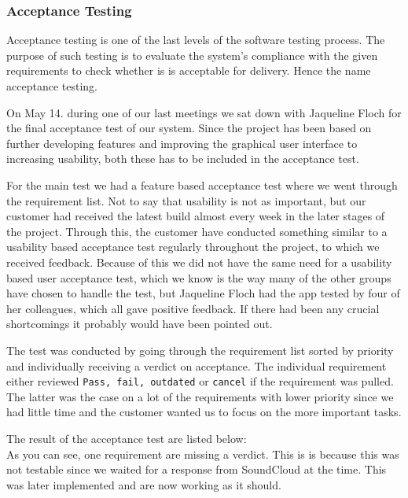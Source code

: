 \subsubsection{Acceptance Testing}
Acceptance testing is one of the last levels of the software testing process. The purpose of such testing is to evaluate the system's compliance with the given requirements to check whether is is acceptable for delivery. Hence the name acceptance testing.

On May 14. during one of our last meetings we sat down with Jaqueline Floch for the final acceptance test of our system. Since the project has been based on further developing features and improving the graphical user interface to increasing usability, both these has to be included in the acceptance test.

For the main test we had a feature based acceptance test where we went through the requirement list. Not to say that usability is not as important, but our customer had received the latest build almost every week in the later stages of the project. Through this, the customer have conducted something similar to a usability based acceptance test regularly throughout the project, to which we received feedback. Because of this we did not have the same need for a usability based user acceptance test, which we know is the way many of the other groups have chosen to handle the test, but Jaqueline Floch had the app tested by four of her colleagues, which all gave positive feedback. If there had been any crucial shortcomings it probably would have been pointed out.

The test was conducted by going through the requirement list sorted by priority and individually receiving a verdict on acceptance. The individual requirement either reviewed \texttt{Pass, fail, outdated} or \texttt{cancel} if the requirement was pulled. The latter was the case on a lot of the requirements with lower priority since we had little time and the customer wanted us to focus on the more important tasks.

The result of the acceptance test are listed below:\\



As you can see, one requirement are missing a verdict. This is is because this was not testable since we waited for a response from SoundCloud at the time. This was later implemented and are now working as it should.


